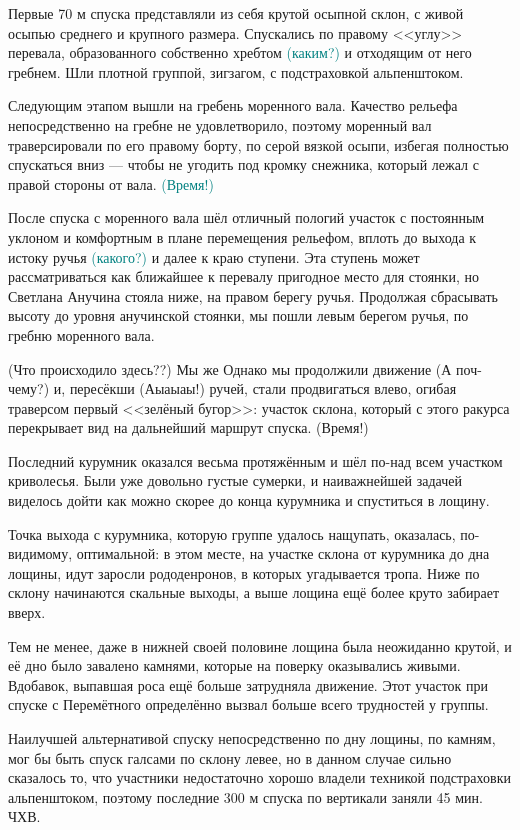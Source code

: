 Первые 70 м спуска представляли из себя крутой осыпной склон, с живой осыпью среднего и крупного размера. Спускались по правому <<углу>> перевала, образованного собственно хребтом \textcolor{teal}{(каким?)} и отходящим от него гребнем. Шли плотной группой, зигзагом, с подстраховкой альпенштоком.  

Следующим этапом вышли на гребень моренного вала. Качество рельефа непосредственно на гребне не удовлетворило, поэтому моренный вал траверсировали по его правому борту, по серой вязкой осыпи, избегая полностью спускаться вниз --- чтобы не угодить под кромку снежника, который лежал с правой стороны от вала. \textcolor{teal}{(Время!)} 

После спуска с моренного вала шёл отличный пологий участок с постоянным уклоном и комфортным в плане перемещения рельефом, вплоть до выхода к истоку ручья \textcolor{teal}{(какого?)} и далее к краю  ступени. Эта ступень может рассматриваться как ближайшее к перевалу пригодное место для стоянки, но Светлана Анучина стояла ниже, на правом берегу ручья. Продолжая сбрасывать высоту до уровня анучинской стоянки, мы пошли левым берегом ручья, по гребню моренного вала. 

\alert{(Что происходило здесь??)} Мы же  Однако мы продолжили движение \alert{(А поч-чему?)} и, пересёкши \alert{(Аыаыаы!)} ручей, стали продвигаться влево, огибая траверсом первый <<зелёный бугор>>: участок склона, который с этого ракурса перекрывает вид на дальнейший маршрут спуска. \alert{(Время!)} 

Последний курумник оказался весьма протяжённым и шёл по-над всем участком криволесья. Были уже довольно густые сумерки, и наиважнейшей задачей виделось дойти как можно скорее до конца курумника и спуститься в лощину. 

Точка выхода с курумника, которую группе удалось нащупать, оказалась, по-видимому, оптимальной: в этом месте, на участке склона от курумника до дна лощины, идут заросли рододенронов, в которых угадывается тропа. Ниже по склону начинаются скальные выходы, а выше лощина ещё более круто забирает вверх. 

Тем не менее, даже в нижней своей половине лощина была неожиданно крутой, и её дно было завалено камнями, которые на поверку оказывались живыми. Вдобавок, выпавшая роса ещё больше затрудняла движение. Этот участок при спуске с Перемётного определённо вызвал больше всего трудностей у группы. 

Наилучшей альтернативой спуску непосредственно по дну лощины, по камням, мог бы быть спуск галсами по склону левее, но в данном случае сильно сказалось то, что участники недостаточно хорошо владели техникой подстраховки альпенштоком, поэтому последние 300 м спуска по вертикали заняли 45 мин. ЧХВ. 




